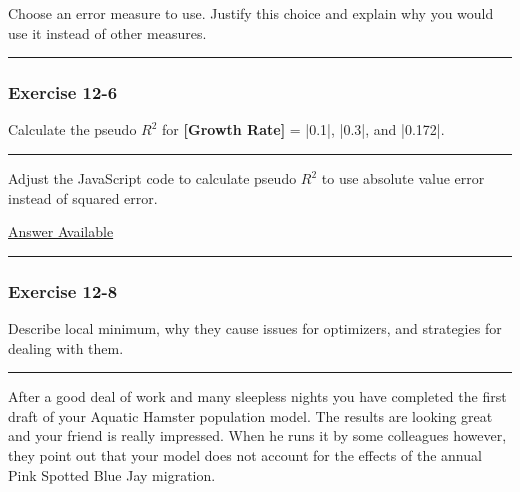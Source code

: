 \documentclass[]{memoir}
\newcommand{\FloatTok}[1]{\textcolor[rgb]{0.25,0.63,0.44}{{#1}}}
\newcommand{\p}[1]{\textbf{{[}#1{]}}}
\begin{document}
Choose an error measure to use. Justify this choice and explain why you
would use it instead of other measures.

\begin{center}\rule{3in}{0.4pt}\end{center}

\subsubsection{Exercise 12-6}

Calculate the pseudo $R^2$ for \p{Growth Rate} = |\FloatTok{0.1}|,
|\FloatTok{0.3}|, and |\FloatTok{0.172}|.

\begin{center}\rule{3in}{0.4pt}\end{center}


Adjust the JavaScript code to calculate pseudo $R^2$ to use absolute
value error instead of squared error.

\hyperref[Ans-12-7]{Answer Available}

\begin{center}\rule{3in}{0.4pt}\end{center}

\subsubsection{Exercise 12-8}

Describe local minimum, why they cause issues for optimizers, and
strategies for dealing with them.

\begin{center}\rule{3in}{0.4pt}\end{center}


After a good deal of work and many sleepless nights you have completed
the first draft of your Aquatic Hamster population model. The results
are looking great and your friend is really impressed. When he runs it
by some colleagues however, they point out that your model does not
account for the effects of the annual Pink Spotted Blue Jay migration.
\end{document}
